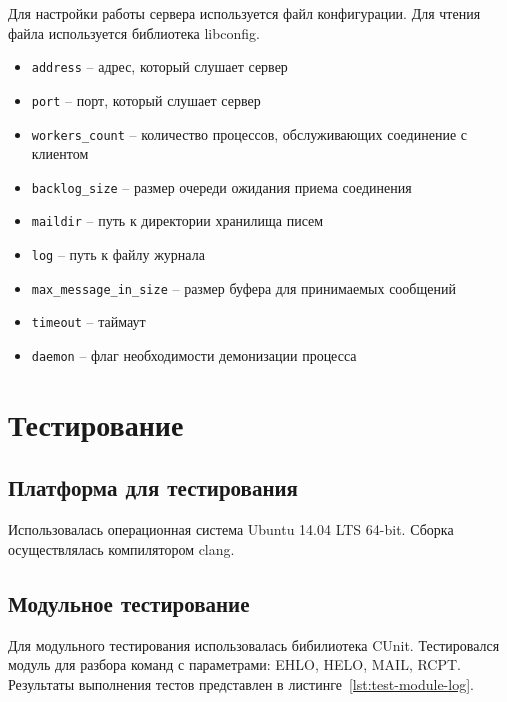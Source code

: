 Для настройки работы сервера используется файл конфигурации.
Для чтения файла используется библиотека libconfig.



\begin{itemize}
\item \verb;address; -- адрес, который слушает сервер
\item \verb;port; -- порт, который слушает сервер
\item \verb;workers_count; -- количество процессов, обслуживающих соединение с клиентом
\item \verb;backlog_size; -- размер очереди ожидания приема соединения
\item \verb;maildir; -- путь к директории хранилища писем
\item \verb;log; -- путь к файлу журнала
\item \verb;max_message_in_size; -- размер буфера для принимаемых сообщений
\item \verb;timeout; -- таймаут
\item \verb;daemon; -- флаг необходимости демонизации процесса
\end{itemize}

\section{Тестирование}

\subsection{Платформа для тестирования}

Использовалась операционная система Ubuntu 14.04 LTS 64-bit.
Сборка осуществлялась компилятором clang.

\subsection{Модульное тестирование}

Для модульного тестирования использовалась бибилиотека CUnit.
Тестировался модуль для разбора команд с параметрами: EHLO, HELO, MAIL, RCPT.
Результаты выполнения тестов представлен в листинге~\ref{lst:test-module-log}.



